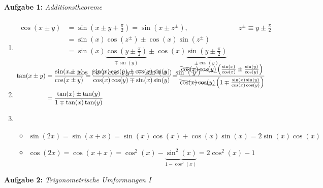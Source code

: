 
\textbf{Aufgabe 1: } \emph{Additionstheoreme}
\begin{enumerate}[label=(\alph*)]
\item \begin{align*}
\\[-4em]\cos(x\pm y)&=\sin\left(x\pm y+\frac{\pi}{2}\right)=\sin(x\pm z^{\pm}), && z^{\pm}\equiv y\pm\frac{\pi}{2}\\
&=\sin(x)\cos(z^\pm)\pm\cos(x)\sin(z^\pm)\\
&=\sin(x)\underbrace{\cos\left(y\pm\frac{\pi}{2}\right)}_{\mp\sin(y)}\pm\cos(x)\underbrace{\sin\left(y\pm\frac{\pi}{2}\right)}_{\pm\cos(y)}\\
&=\cos(x)\cos(y)\mp\sin(x)\sin(y)
\end{align*}
\item \begin{align*}
\\[-5em]\tan(x\pm y)&=\frac{\sin(x\pm y)}{\cos(x\pm y)}=\frac{\sin(x)\cos(y)\pm\cos(x)\sin(y)}{\cos(x)\cos(y)\mp\sin(x)\sin(y)}=\frac{\bcancel{\cos(x)\cos(y)}\left(\frac{\sin(x)}{\cos(x)}\pm\frac{\sin(y)}{\cos(y)}\right)}{\bcancel{\cos(x)\cos(y)}\left(1\mp\frac{\sin(x)\sin(y)}{\cos(x)\cos(y)}\right)}\\
&=\frac{\tan(x)\pm\tan(y)}{1\mp\tan(x)\tan(y)}
\end{align*}
\item \begin{itemize}
\item $\sin(2x)=\sin(x+x)=\sin(x)\cos(x)+\cos(x)\sin(x)=2\sin(x)\cos(x)$
\item $\cos(2x)=\cos(x+x)=\cos^2(x)-\underbrace{\sin^2(x)}_{1-\cos^2(x)}=2\cos^2(x)-1$
\end{itemize}
\end{enumerate}
\vspace{0.7cm}
%
\textbf{Aufgabe 2: } \emph{Trigonometrische Umformungen I}
